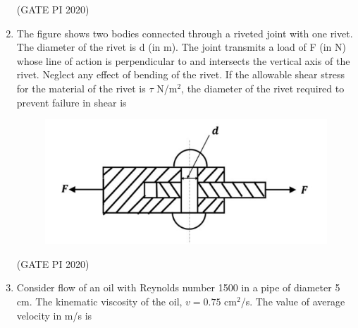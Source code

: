 \documentclass[journal,12pt,onecolumn]{IEEEtran}
\theoremstyle{remark}
\begin{document}
\begin{enumerate}
\hfill (GATE PI 2020)

\item The figure shows two bodies connected through a riveted joint with one rivet. The diameter of the rivet is d (in m). The joint transmits a load of F (in N) whose line of action is perpendicular to and intersects the vertical axis of the rivet. Neglect any effect of bending of the rivet. If the allowable shear stress for the material of the rivet is $\tau$ N/m$^2$, the diameter of the rivet required to prevent failure in shear is

\newpage

\begin{figure}[h]
    \centering
    \includegraphics[width=0.5\columnwidth]{figs/fig9.png}
    \caption{}
    \label{fig:placeholder}
\end{figure}

\begin{enumerate}
\end{enumerate}

\hfill (GATE PI 2020)

\item Consider flow of an oil with Reynolds number 1500 in a pipe of diameter 5 cm. The kinematic viscosity of the oil, $v = 0.75$ cm$^2$/s. The value of average velocity in m/s is

\begin{enumerate}
\end{enumerate}


\end{enumerate}
\end{document}
